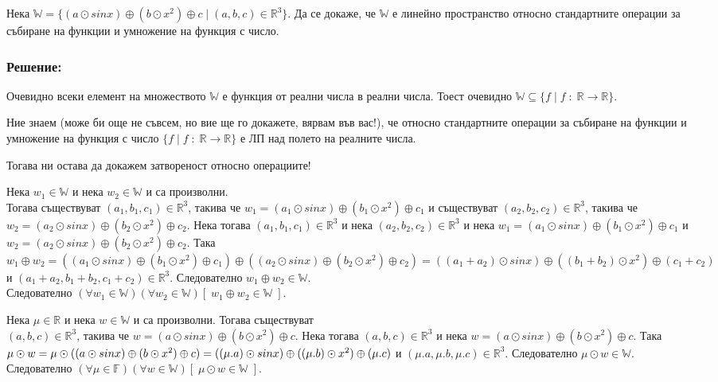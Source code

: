 \documentclass{article}[12pt]
\begin{document}
Нека \(\mathbb{W} = \{(a \odot sinx) \oplus (b \odot x^2) \oplus c \; | \; (a, b, c) \in \mathbb{R}^3 \}\).
Да се докаже, че \(\mathbb{W}\) е линейно пространство относно стандартните операции за събиране на функции и умножение на функция с число.

\subsubsection{Решение:}

Очевидно всеки елемент на множеството \(\mathbb{W}\) е функция от реални числа в реални числа.
Тоест очевидно \(\mathbb{W} \subseteq \{f \; | \; f \; : \; \mathbb{R} \to \mathbb{R} \}\).

Ние знаем (може би още не съвсем, но вие ще го докажете, вярвам във вас!),
че относно стандартните операции за събиране на функции и умножение на функция с число
\(\{f \; | \; f \; : \; \mathbb{R} \to \mathbb{R} \}\) е ЛП над полето на реалните числа.

Тогава ни остава да докажем затвореност относно операциите!

Нека \(w_1 \in  \mathbb{W}\) и нека \(w_2 \in  \mathbb{W}\) и са произволни. \\
Тогава съществуват \((a_1, b_1, c_1) \in \mathbb{R}^3\), такива че \(w_1 = (a_1 \odot  sinx) \oplus (b_1 \odot x^2) \oplus c_1\)
и съществуват \((a_2, b_2, c_2) \in \mathbb{R}^3\), такива че \(w_2 = (a_2 \odot  sinx) \oplus (b_2 \odot x^2) \oplus c_2\).
Нека тогава \((a_1, b_1, c_1) \in \mathbb{R}^3\) и нека \((a_2, b_2, c_2) \in \mathbb{R}^3\)
и нека \(w_1 = (a_1 \odot  sinx) \oplus (b_1 \odot x^2) \oplus c_1\) и \(w_2 = (a_2 \odot  sinx) \oplus (b_2 \odot x^2) \oplus c_2\).
Така \(w_1 \oplus w_2 = ((a_1 \odot  sinx) \oplus (b_1 \odot x^2) \oplus c_1) \oplus ((a_2 \odot  sinx) \oplus (b_2 \odot x^2) \oplus c_2) =
((a_1 + a_2) \odot sinx) \oplus ((b_1 + b_2) \odot x^2) \oplus (c_1 + c_2)\)
\\  и \((a_1 + a_2, b_1 + b_2, c_1 + c_2) \in \mathbb{R}^3\).
Следователно \(w_1 \oplus w_2 \in  \mathbb{W}\). \\
Следователно \((\forall w_1 \in \mathbb{W})(\forall w_2 \in \mathbb{W})[\; w_1 \oplus w_2 \in \mathbb{W} \;]\).

Нека \(\mu \in \mathbb{R}\) и нека \(w \in  \mathbb{W}\) и са произволни.
Тогава съществуват \\
\((a, b, c) \in \mathbb{R}^3\), такива че \(w = (a \odot sinx) \oplus (b \odot x^2) \oplus c\).
Нека тогава \((a, b, c) \in \mathbb{R}^3\) и нека \(w = (a \odot sinx) \oplus (b \odot x^2) \oplus c\).
Така \(\mu \odot w = \mu \odot ((a \odot sinx) \oplus (b \odot x^2) \oplus c) = \\
((\mu.a) \odot sinx) \oplus ((\mu.b) \odot x^2) \oplus (\mu.c)\) и \((\mu.a, \mu.b, \mu.c) \in \mathbb{R}^3\).
Следователно \(\mu \odot w \in  \mathbb{W}\).
Следователно \((\forall \mu \in \mathbb{F})(\forall w \in \mathbb{W})[\; \mu \odot w \in \mathbb{W} \;]\).
\end{document}
